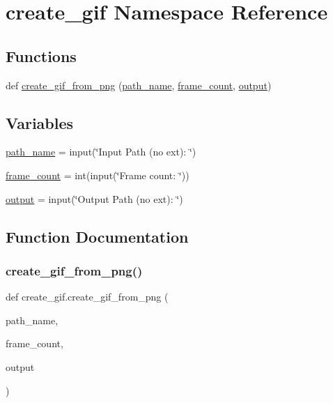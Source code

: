 \hypertarget{namespacecreate__gif}{}\section{create\+\_\+gif Namespace Reference}
\label{namespacecreate__gif}
\subsection*{Functions}
\begin{DoxyCompactItemize}
\item 
def \mbox{\hyperlink{namespacecreate__gif_ab64559b25583d234fb61bd16db7e14cc}{create\+\_\+gif\+\_\+from\+\_\+png}} (\mbox{\hyperlink{namespacecreate__gif_aab19cf44cc2d4d83200c29825b881639}{path\+\_\+name}}, \mbox{\hyperlink{namespacecreate__gif_abac19e3a427fb292d807a5f270d9b1bf}{frame\+\_\+count}}, \mbox{\hyperlink{namespacecreate__gif_ab6dfc2d61e95d5ee061db577c2474ad9}{output}})
\end{DoxyCompactItemize}
\subsection*{Variables}
\begin{DoxyCompactItemize}
\item 
\mbox{\hyperlink{namespacecreate__gif_aab19cf44cc2d4d83200c29825b881639}{path\+\_\+name}} = input(\char`\"{}Input Path (no ext)\+: \char`\"{})
\item 
\mbox{\hyperlink{namespacecreate__gif_abac19e3a427fb292d807a5f270d9b1bf}{frame\+\_\+count}} = int(input(\char`\"{}Frame count\+: \char`\"{}))
\item 
\mbox{\hyperlink{namespacecreate__gif_ab6dfc2d61e95d5ee061db577c2474ad9}{output}} = input(\char`\"{}Output Path (no ext)\+: \char`\"{})
\end{DoxyCompactItemize}


\subsection{Function Documentation}
\mbox{\label{namespacecreate__gif_ab64559b25583d234fb61bd16db7e14cc}} 
\subsubsection{\texorpdfstring{create\+\_\+gif\+\_\+from\+\_\+png()}{create\_gif\_from\_png()}}
{\footnotesize\ttfamily def create\+\_\+gif.\+create\+\_\+gif\+\_\+from\+\_\+png (\begin{DoxyParamCaption}\item[{}]{path\+\_\+name,  }\item[{}]{frame\+\_\+count,  }\item[{}]{output }\end{DoxyParamCaption})}



